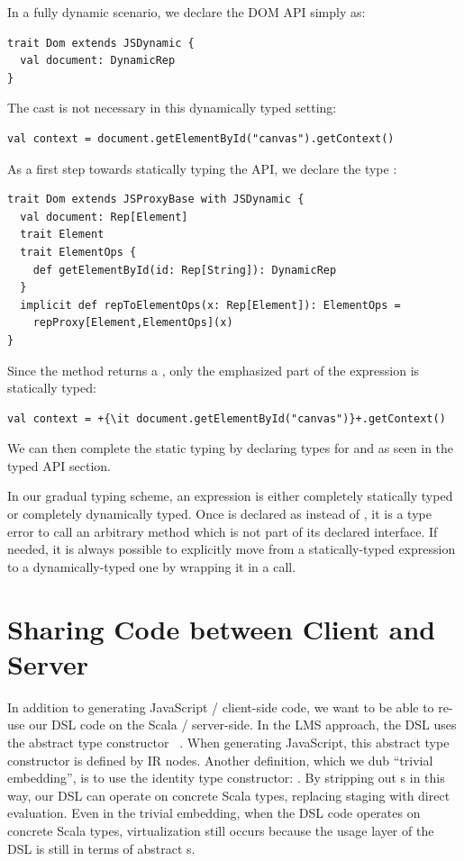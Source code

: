 \documentclass[runningheads,a4paper]{llncs}
\begin{document}
In a fully dynamic scenario, we declare the DOM API simply as:
\begin{lstlisting}
trait Dom extends JSDynamic {
  val document: DynamicRep
}
\end{lstlisting}
The  cast is not necessary in this dynamically typed
setting:
\begin{lstlisting}[escapechar=+]
val context = document.getElementById("canvas").getContext()
\end{lstlisting}

As a first step towards statically typing the API, we declare the type :
\begin{lstlisting}
trait Dom extends JSProxyBase with JSDynamic {
  val document: Rep[Element]
  trait Element
  trait ElementOps {
    def getElementById(id: Rep[String]): DynamicRep
  }
  implicit def repToElementOps(x: Rep[Element]): ElementOps =
    repProxy[Element,ElementOps](x)
}
\end{lstlisting}
Since the method  returns a ,
only the emphasized part of the expression is statically typed:
\begin{lstlisting}[escapechar=+]
val context = +{\it document.getElementById("canvas")}+.getContext()
\end{lstlisting}

We can then complete the static typing by declaring types for
 and  as seen in the typed API section.

In our gradual typing scheme, an expression is either completely
statically typed or completely dynamically typed. Once 
is declared as  instead of , it is
a type error to call an arbitrary method which is not part of its
declared  interface. If needed, it is always possible to
explicitly move from a statically-typed expression to a
dynamically-typed one by wrapping it in a  call.

\section{Sharing Code between Client and Server}\label{sec:trivial-embedding} %
In addition to generating JavaScript / client-side code, we want to be able to re-use our DSL code on the Scala / server-side. In the LMS approach, the DSL uses the abstract type constructor ~\cite{higher-kind}. When generating JavaScript, this abstract type constructor is defined by IR nodes. Another definition, which we dub ``trivial embedding'', is to use the identity type constructor: . By stripping out s in this way, our DSL can operate on concrete Scala types, replacing staging with direct evaluation. Even in the trivial embedding, when the DSL code operates on concrete Scala types, virtualization still occurs because the usage layer of the DSL is still in terms of abstract s.
\end{document}
